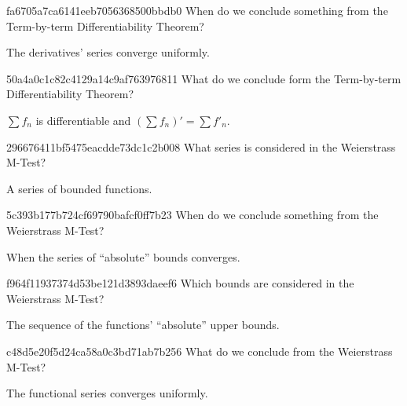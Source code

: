 \begin{note}{fa6705a7ca6141eeb7056368500bbdb0}
    When do we conclude something from the Term-by-term Differentiability Theorem?

    \begin{cloze}{1}
        The derivatives' series converge uniformly.
    \end{cloze}
\end{note}

\begin{note}{50a4a0c1c82c4129a14c9af763976811}
    What do we conclude form the Term-by-term Differentiability Theorem?

    \begin{cloze}{1}
        \({ \sum f_n }\) is differentiable and \({ \left( \sum f_n \right)' = \sum f'_n }\).
    \end{cloze}
\end{note}

\begin{note}{296676411bf5475eacdde73dc1c2b008}
    What series is considered in the Weierstrass M-Test?

    \begin{cloze}{1}
        A series of bounded functions.
    \end{cloze}
\end{note}

\begin{note}{5c393b177b724cf69790bafcf0ff7b23}
    When do we conclude something from the Weierstrass M-Test?

    \begin{cloze}{1}
        When the series of ``absolute'' bounds converges.
    \end{cloze}
\end{note}

\begin{note}{f964f11937374d53be121d3893daeef6}
    Which bounds are considered in the Weierstrass M-Test?

    \begin{cloze}{1}
        The sequence of the functions' ``absolute'' upper bounds.
    \end{cloze}
\end{note}

\begin{note}{c48d5e20f5d24ca58a0c3bd71ab7b256}
    What do we conclude from the Weierstrass M-Test?

    \begin{cloze}{1}
        The functional series converges uniformly.
    \end{cloze}
\end{note}

